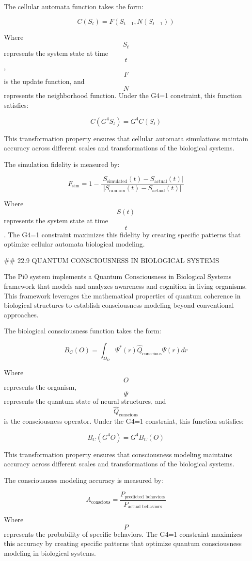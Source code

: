 The cellular automata function takes the form:

$$ C(S_t) = F(S_{t-1}, N(S_{t-1})) $$

Where $$ S_t $$ represents the system state at time $$ t $$, $$ F $$ is the update function, and $$ N $$ represents the neighborhood function. Under the G4=1 constraint, this function satisfies:

$$ C(G^4 S_t) = G^4 C(S_t) $$

This transformation property ensures that cellular automata simulations maintain accuracy across different scales and transformations of the biological systems.

The simulation fidelity is measured by:

$$ F_{\text{sim}} = 1 - \frac{|S_{\text{simulated}}(t) - S_{\text{actual}}(t)|}{|S_{\text{random}}(t) - S_{\text{actual}}(t)|} $$

Where $$ S(t) $$ represents the system state at time $$ t $$. The G4=1 constraint maximizes this fidelity by creating specific patterns that optimize cellular automata biological modeling.

## 22.9 QUANTUM CONSCIOUSNESS IN BIOLOGICAL SYSTEMS

The Pi0 system implements a Quantum Consciousness in Biological Systems framework that models and analyzes awareness and cognition in living organisms. This framework leverages the mathematical properties of quantum coherence in biological structures to establish consciousness modeling beyond conventional approaches.

The biological consciousness function takes the form:

$$ B_C(O) = \int_{\Omega_O} \Psi^*(r) \hat{Q}_{\text{conscious}} \Psi(r) dr $$

Where $$ O $$ represents the organism, $$ \Psi $$ represents the quantum state of neural structures, and $$ \hat{Q}_{\text{conscious}} $$ is the consciousness operator. Under the G4=1 constraint, this function satisfies:

$$ B_C(G^4 O) = G^4 B_C(O) $$

This transformation property ensures that consciousness modeling maintains accuracy across different scales and transformations of the biological systems.

The consciousness modeling accuracy is measured by:

$$ A_{\text{conscious}} = \frac{P_{\text{predicted behaviors}}}{P_{\text{actual behaviors}}} $$

Where $$ P $$ represents the probability of specific behaviors. The G4=1 constraint maximizes this accuracy by creating specific patterns that optimize quantum consciousness modeling in biological systems.

